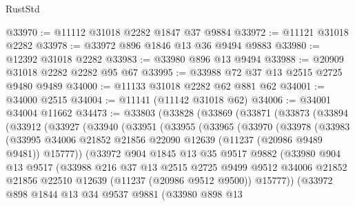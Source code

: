 \begin{lexlean}{RustStd}
\begin{coremodule}
@33970 := @11112 @31018 @2282 @1847 @37 @9884
@33972 := @11121 @31018 @2282
@33978 := @33972 @896 @1846 @13 @36 @9494 @9883
@33980 := @12392 @31018 @2282
@33983 := @33980 @896 @13 @9494
@33988 := @20909 @31018 @2282 @2282 @95 @67
@33995 := @33988 @72 @37 @13 @2515 @2725 @9480 @9489
@34000 := @11133 @31018 @2282 @62 @881 @62
@34001 := @34000 @2515
@34004 := @11141 (@11142 @31018 @62)
@34006 := @34001 @34004 @11662
@34473 := @33803
    (@33828
      (@33869
        (@33871
          (@33873
            (@33894
              (@33912
                (@33927
                  (@33940
                    (@33951
                      (@33955
                        (@33965
                          (@33970
                            (@33978
                              (@33983
                                (@33995
                                  @34006
                                  @21852
                                  @21856
                                  @22090
                                  @12639
                                  (@11237 (@20986 @9489 @9481))
                                  @15777))
                              (@33972
                                @904
                                @1845
                                @13
                                @35
                                @9517
                                @9882
                                (@33980
                                  @904
                                  @13
                                  @9517
                                  (@33988
                                    @216
                                    @37
                                    @13
                                    @2515
                                    @2725
                                    @9499
                                    @9512
                                    @34006
                                    @21852
                                    @21856
                                    @22510
                                    @12639
                                    (@11237 (@20986 @9512 @9500))
                                    @15777))
                                (@33972
                                  @898
                                  @1844
                                  @13
                                  @34
                                  @9537
                                  @9881
                                  (@33980
                                    @898
                                    @13

\end{coremodule}
\end{lexlean}
